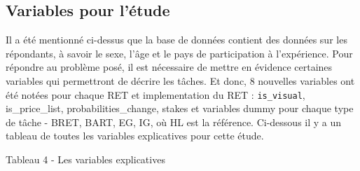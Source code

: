 \documentclass[12pt]{article}
\begin{document}
\subsection{Variables pour l'étude}

Il a été mentionné ci-dessus que la base de données contient des données
sur les répondants, à savoir le sexe, l'âge et le pays de participation
à l'expérience. Pour répondre au problème posé, il est nécessaire de
mettre en évidence certaines variables qui permettront de décrire les
tâches. Et donc, 8 nouvelles variables ont été notées pour chaque RET et
implementation du RET : \texttt{is\_visual}, is\_price\_list,
probabilities\_change, stakes et variables dummy pour chaque type de
tâche - BRET, BART, EG, IG, où HL est la référence. Ci-dessous il y a un
tableau de toutes les variables explicatives pour cette étude.

Tableau 4 - Les variables explicatives
\end{document}
